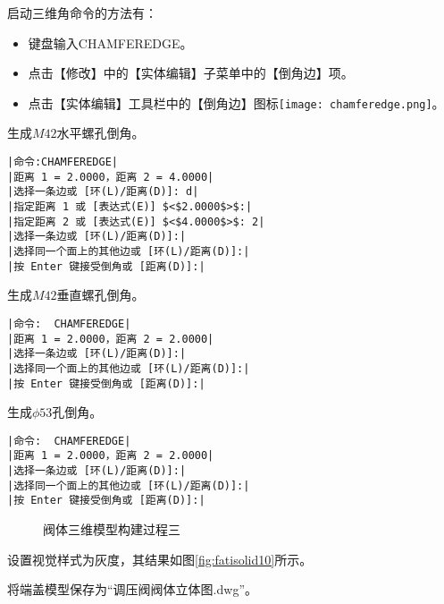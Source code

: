 \begin{procedure}
启动三维角命令的方法有：
\begin{itemize}
\item 键盘输入CHAMFEREDGE。
\item 点击【修改】中的【实体编辑】子菜单中的【倒角边】项。
\item 点击【实体编辑】工具栏中的【倒角边】图标\texttt{[image: chamferedge.png]}。
\end{itemize}
生成$M42$水平螺孔倒角。
\begin{lstlisting}
|命令:CHAMFEREDGE|
|距离 1 = 2.0000，距离 2 = 4.0000|
|选择一条边或 [环(L)/距离(D)]: d|
|指定距离 1 或 [表达式(E)] $<$2.0000$>$:|
|指定距离 2 或 [表达式(E)] $<$4.0000$>$: 2|
|选择一条边或 [环(L)/距离(D)]:|
|选择同一个面上的其他边或 [环(L)/距离(D)]:|
|按 Enter 键接受倒角或 [距离(D)]:|
\end{lstlisting}
生成$M42$垂直螺孔倒角。
\begin{lstlisting}
|命令:  CHAMFEREDGE|
|距离 1 = 2.0000，距离 2 = 2.0000|
|选择一条边或 [环(L)/距离(D)]:|
|选择同一个面上的其他边或 [环(L)/距离(D)]:|
|按 Enter 键接受倒角或 [距离(D)]:|
\end{lstlisting}
生成$\phi 53$孔倒角。
\begin{lstlisting}
|命令:  CHAMFEREDGE|
|距离 1 = 2.0000，距离 2 = 2.0000|
|选择一条边或 [环(L)/距离(D)]:|
|选择同一个面上的其他边或 [环(L)/距离(D)]:|
|按 Enter 键接受倒角或 [距离(D)]:|
\end{lstlisting}
\begin{figure}[htbp]
\centering
{}\hspace{30pt}
\caption{阀体三维模型构建过程三}
\end{figure}
\item 设置视觉样式为灰度，其结果如图\ref{fig:fatisolid10}所示。
\item 将端盖模型保存为“调压阀阀体立体图.dwg”。
\end{procedure}
\endinput